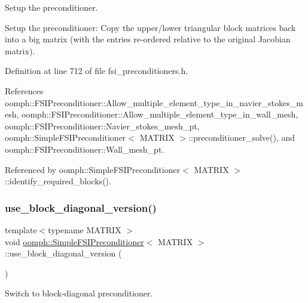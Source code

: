 Setup the preconditioner. 

Setup the preconditioner\+: Copy the upper/lower triangular block matrices back into a big matrix (with the entries re-\/ordered relative to the original Jacobian matrix). 

Definition at line 712 of file fsi\+\_\+preconditioners.\+h.



References oomph\+::\+F\+S\+I\+Preconditioner\+::\+Allow\+\_\+multiple\+\_\+element\+\_\+type\+\_\+in\+\_\+navier\+\_\+stokes\+\_\+mesh, oomph\+::\+F\+S\+I\+Preconditioner\+::\+Allow\+\_\+multiple\+\_\+element\+\_\+type\+\_\+in\+\_\+wall\+\_\+mesh, oomph\+::\+F\+S\+I\+Preconditioner\+::\+Navier\+\_\+stokes\+\_\+mesh\+\_\+pt, oomph\+::\+Simple\+F\+S\+I\+Preconditioner$<$ M\+A\+T\+R\+I\+X $>$\+::preconditioner\+\_\+solve(), and oomph\+::\+F\+S\+I\+Preconditioner\+::\+Wall\+\_\+mesh\+\_\+pt.



Referenced by oomph\+::\+Simple\+F\+S\+I\+Preconditioner$<$ M\+A\+T\+R\+I\+X $>$\+::identify\+\_\+required\+\_\+blocks().

\mbox{\label{classoomph_1_1SimpleFSIPreconditioner_a9e4313b890f586d4e1fb406a1b9d3948}} 
\subsubsection{\texorpdfstring{use\+\_\+block\+\_\+diagonal\+\_\+version()}{use\_block\_diagonal\_version()}}
{\footnotesize\ttfamily template$<$typename M\+A\+T\+R\+IX $>$ \\
void \hyperlink{classoomph_1_1SimpleFSIPreconditioner}{oomph\+::\+Simple\+F\+S\+I\+Preconditioner}$<$ M\+A\+T\+R\+IX $>$\+::use\+\_\+block\+\_\+diagonal\+\_\+version (\begin{DoxyParamCaption}{ }\end{DoxyParamCaption})\hspace{0.3cm}{\ttfamily [inline]}}



Switch to block-\/diagonal preconditioner. 



